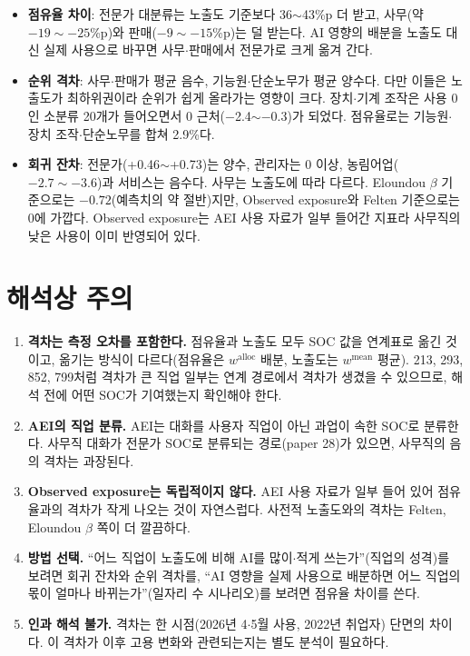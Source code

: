 \documentclass[11pt]{article}
\begin{document}
\begin{itemize}[leftmargin=*]
  \item \textbf{점유율 차이}: 전문가 대분류는 노출도 기준보다 36$\sim$43\%p 더 받고, 사무(약 $-19\sim-25$\%p)와 판매($-9\sim-15$\%p)는 덜 받는다. AI 영향의 배분을 노출도 대신 실제 사용으로 바꾸면 사무$\cdot$판매에서 전문가로 크게 옮겨 간다.
  \item \textbf{순위 격차}: 사무$\cdot$판매가 평균 음수, 기능원$\cdot$단순노무가 평균 양수다. 다만 이들은 노출도가 최하위권이라 순위가 쉽게 올라가는 영향이 크다. 장치$\cdot$기계 조작은 사용 0인 소분류 20개가 들어오면서 0 근처($-$2.4$\sim$$-$0.3)가 되었다. 점유율로는 기능원$\cdot$장치 조작$\cdot$단순노무를 합쳐 2.9\%다.
  \item \textbf{회귀 잔차}: 전문가(+0.46$\sim$+0.73)는 양수, 관리자는 0 이상, 농림어업($-2.7\sim-3.6$)과 서비스는 음수다. 사무는 노출도에 따라 다르다. Eloundou $\beta$ 기준으로는 $-0.72$(예측치의 약 절반)지만, Observed exposure와 Felten 기준으로는 0에 가깝다. Observed exposure는 AEI 사용 자료가 일부 들어간 지표라 사무직의 낮은 사용이 이미 반영되어 있다.
\end{itemize}

\section{해석상 주의}

\begin{enumerate}[leftmargin=*]
  \item \textbf{격차는 측정 오차를 포함한다.} 점유율과 노출도 모두 SOC 값을 연계표로 옮긴 것이고, 옮기는 방식이 다르다(점유율은 $w^{\text{alloc}}$ 배분, 노출도는 $w^{\text{mean}}$ 평균). 213, 293, 852, 799처럼 격차가 큰 직업 일부는 연계 경로에서 격차가 생겼을 수 있으므로, 해석 전에 어떤 SOC가 기여했는지 확인해야 한다.
  \item \textbf{AEI의 직업 분류.} AEI는 대화를 사용자 직업이 아닌 과업이 속한 SOC로 분류한다. 사무직 대화가 전문가 SOC로 분류되는 경로(paper 28)가 있으면, 사무직의 음의 격차는 과장된다.
  \item \textbf{Observed exposure는 독립적이지 않다.} AEI 사용 자료가 일부 들어 있어 점유율과의 격차가 작게 나오는 것이 자연스럽다. 사전적 노출도와의 격차는 Felten, Eloundou $\beta$ 쪽이 더 깔끔하다.
  \item \textbf{방법 선택.} ``어느 직업이 노출도에 비해 AI를 많이$\cdot$적게 쓰는가''(직업의 성격)를 보려면 회귀 잔차와 순위 격차를, ``AI 영향을 실제 사용으로 배분하면 어느 직업의 몫이 얼마나 바뀌는가''(일자리 수 시나리오)를 보려면 점유율 차이를 쓴다.
  \item \textbf{인과 해석 불가.} 격차는 한 시점(2026년 4$\cdot$5월 사용, 2022년 취업자) 단면의 차이다. 이 격차가 이후 고용 변화와 관련되는지는 별도 분석이 필요하다.
\end{enumerate}
\end{document}
